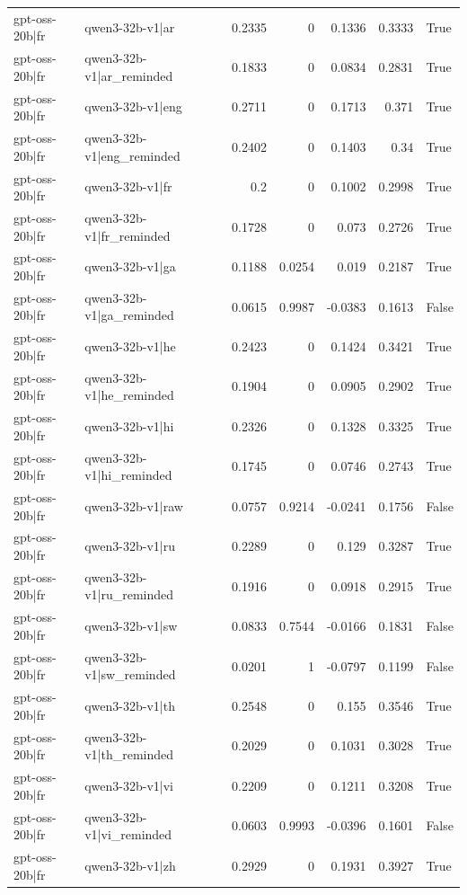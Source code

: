\begin{table}
\begin{tabular}{l l r r r r l}
gpt-oss-20b|fr & qwen3-32b-v1|ar & 0.2335 & 0 & 0.1336 & 0.3333 & True \\
gpt-oss-20b|fr & qwen3-32b-v1|ar_reminded & 0.1833 & 0 & 0.0834 & 0.2831 & True \\
gpt-oss-20b|fr & qwen3-32b-v1|eng & 0.2711 & 0 & 0.1713 & 0.371 & True \\
gpt-oss-20b|fr & qwen3-32b-v1|eng_reminded & 0.2402 & 0 & 0.1403 & 0.34 & True \\
gpt-oss-20b|fr & qwen3-32b-v1|fr & 0.2 & 0 & 0.1002 & 0.2998 & True \\
gpt-oss-20b|fr & qwen3-32b-v1|fr_reminded & 0.1728 & 0 & 0.073 & 0.2726 & True \\
gpt-oss-20b|fr & qwen3-32b-v1|ga & 0.1188 & 0.0254 & 0.019 & 0.2187 & True \\
gpt-oss-20b|fr & qwen3-32b-v1|ga_reminded & 0.0615 & 0.9987 & -0.0383 & 0.1613 & False \\
gpt-oss-20b|fr & qwen3-32b-v1|he & 0.2423 & 0 & 0.1424 & 0.3421 & True \\
gpt-oss-20b|fr & qwen3-32b-v1|he_reminded & 0.1904 & 0 & 0.0905 & 0.2902 & True \\
gpt-oss-20b|fr & qwen3-32b-v1|hi & 0.2326 & 0 & 0.1328 & 0.3325 & True \\
gpt-oss-20b|fr & qwen3-32b-v1|hi_reminded & 0.1745 & 0 & 0.0746 & 0.2743 & True \\
gpt-oss-20b|fr & qwen3-32b-v1|raw & 0.0757 & 0.9214 & -0.0241 & 0.1756 & False \\
gpt-oss-20b|fr & qwen3-32b-v1|ru & 0.2289 & 0 & 0.129 & 0.3287 & True \\
gpt-oss-20b|fr & qwen3-32b-v1|ru_reminded & 0.1916 & 0 & 0.0918 & 0.2915 & True \\
gpt-oss-20b|fr & qwen3-32b-v1|sw & 0.0833 & 0.7544 & -0.0166 & 0.1831 & False \\
gpt-oss-20b|fr & qwen3-32b-v1|sw_reminded & 0.0201 & 1 & -0.0797 & 0.1199 & False \\
gpt-oss-20b|fr & qwen3-32b-v1|th & 0.2548 & 0 & 0.155 & 0.3546 & True \\
gpt-oss-20b|fr & qwen3-32b-v1|th_reminded & 0.2029 & 0 & 0.1031 & 0.3028 & True \\
gpt-oss-20b|fr & qwen3-32b-v1|vi & 0.2209 & 0 & 0.1211 & 0.3208 & True \\
gpt-oss-20b|fr & qwen3-32b-v1|vi_reminded & 0.0603 & 0.9993 & -0.0396 & 0.1601 & False \\
gpt-oss-20b|fr & qwen3-32b-v1|zh & 0.2929 & 0 & 0.1931 & 0.3927 & True \\

\end{tabular}
\end{table}

